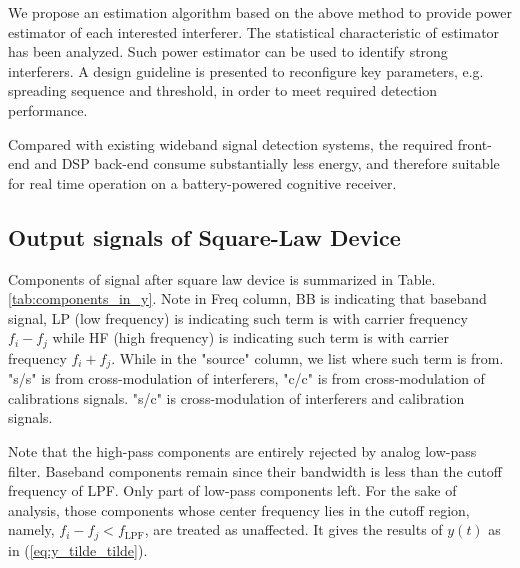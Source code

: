 \documentclass{IEEEtran}
\begin{document}
We propose an estimation algorithm based on the above method to provide power estimator of each interested interferer. The statistical characteristic of estimator has been analyzed. Such power estimator can be used to identify strong interferers. A design guideline is presented to reconfigure key parameters, e.g. spreading sequence and threshold, in order to meet required detection performance. 

Compared with existing wideband signal detection systems, the required front-end and DSP back-end consume substantially less energy, and therefore suitable for real time operation on a battery-powered cognitive receiver.
\appendix
%
%
\subsection{Output signals of Square-Law Device}
\label{sec:components_in_y}

Components of signal after square law device is summarized in Table.\ref{tab:components_in_y}. Note in Freq column, BB is indicating that baseband signal, LP (low frequency) is indicating such term is with carrier frequency $f_i-f_j$ while HF (high frequency) is indicating such term is with carrier frequency $f_i+f_j$.
While in the "source" column, we list where such term is from. "s/s" is from cross-modulation of interferers, "c/c" is from cross-modulation of calibrations signals. "s/c" is cross-modulation of interferers and calibration signals.

Note that the high-pass components are entirely rejected by analog low-pass filter. Baseband components remain since their bandwidth is less than the cutoff frequency of LPF. Only part of low-pass components left. For the sake of analysis, those components whose center frequency lies in the cutoff region, namely, $f_i-f_j<f_{\text{LPF}}$, are treated as unaffected. It gives the results of $y(t)$ as in (\ref{eq:y_tilde_tilde}).
\end{document}
